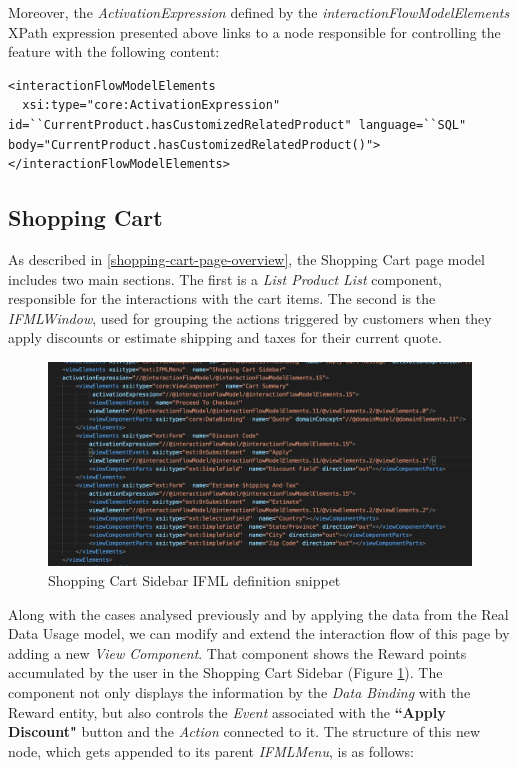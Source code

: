 Moreover, the \textit{ActivationExpression} defined by the \textit{interactionFlowModelElements} XPath expression presented above links to a node responsible for controlling the feature with the following content:

\vspace{0.5cm}
\lstset{language=XML}
\begin{lstlisting} 
<interactionFlowModelElements 
  xsi:type="core:ActivationExpression" id=``CurrentProduct.hasCustomizedRelatedProduct" language=``SQL" body="CurrentProduct.hasCustomizedRelatedProduct()">
</interactionFlowModelElements>

\end{lstlisting}
\vspace{0.5cm}
\subsection{Shopping Cart}
\label{shopping-cart-updates}

As described in \ref{shopping-cart-page-overview}, the Shopping Cart page model includes two main sections. The first is a \textit{List Product List} component, responsible for the interactions with the cart items. The second is the \textit{IFMLWindow}, used for grouping the actions triggered by customers when they apply discounts or estimate shipping and taxes for their current quote.

\vspace{0.5cm}
\begin{figure}[H]
  \centering
    \includegraphics[width=12cm]{images/madison/ifml-shopping-cart-sidebar.png}
  \caption{Shopping Cart Sidebar IFML definition snippet}
  \label{fig:shopping-cart-sidebar-ifml-definition}
\end{figure}
\vspace{0.5cm}

Along with the cases analysed previously and by applying the data from the Real Data Usage model, we can modify and extend the interaction flow of this page by adding a new \textit{View Component}. That component shows the Reward points accumulated by the user in the Shopping Cart Sidebar (Figure \ref{fig:shopping-cart-sidebar-ifml-definition}). The component not only displays the information by the \textit{Data Binding} with the Reward entity, but also controls the \textit{Event} associated with the \textbf{``Apply Discount"} button and the \textit{Action} connected to it. 
The structure of this new node, which gets appended to its parent \textit{IFMLMenu}, is as follows:

